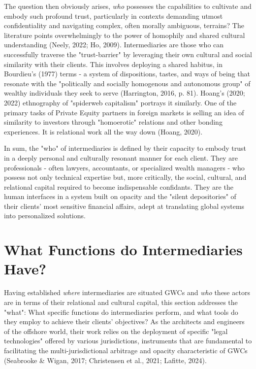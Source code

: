 The question then obviously arises, \textit{who} possesses the capabilities to cultivate and embody such profound trust, particularly in contexts demanding utmost confidentiality and navigating complex, often morally ambiguous, terrains? The literature points overwhelmingly to the power of homophily and shared cultural understanding (Neely, 2022; Ho, 2009). Intermediaries are those who can successfully traverse the "trust-barrier" by leveraging their own cultural and social similarity with their clients. This involves deploying a shared habitus, in Bourdieu's (1977) terms - a system of dispositions, tastes, and ways of being that resonate with the "politically and socially homogenous and autonomous group" of wealthy individuals they seek to serve (Harrington, 2016, p. 81). Hoang’s (2020; 2022) ethnography of "spiderweb capitalism" portrays it similarly. One of the primary tasks of Private Equity partners in foreign markets is selling an idea of similarity to investors through "homoerotic" relations and other bonding experiences. It is relational work all the way down (Hoang, 2020).

In sum, the "who" of intermediaries is defined by their capacity to embody trust in a deeply personal and culturally resonant manner for each client. They are professionals - often lawyers, accountants, or specialized wealth managers - who possess not only technical expertise but, more critically, the social, cultural, and relational capital required to become indispensable confidants. They are the human interfaces in a system built on opacity and the "silent depositories" of their clients' most sensitive financial affairs, adept at translating global systems into personalized solutions.

\section{What Functions do Intermediaries Have?}

Having established \textit{where} intermediaries are situated GWCs and \textit{who} these actors are in terms of their relational and cultural capital, this section addresses the "what": What specific functions do intermediaries perform, and what tools do they employ to achieve their clients' objectives?  As the architects and engineers of the offshore world, their work relies on the deployment of specific "legal technologies" offered by various jurisdictions, instruments that are fundamental to facilitating the multi-jurisdictional arbitrage and opacity characteristic of GWCs (Seabrooke \& Wigan, 2017; Christensen et al., 2021; Lafitte, 2024). 

